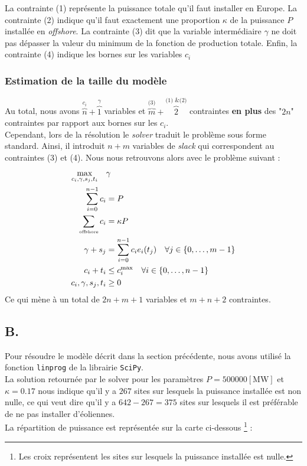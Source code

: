 \documentclass{article}
\begin{document}
La contrainte (1) représente la puissance totale qu'il faut installer en Europe. La contrainte (2) indique qu'il faut exactement une proportion $\kappa$ de la puissance $P$ installée en \textit{offshore}. La contrainte (3) dit que la variable intermédiaire $\gamma$ ne doit pas dépasser la valeur du minimum de la fonction de production totale. Enfin, la contrainte (4) indique les bornes sur les variables $c_i$

\subsubsection*{Estimation de la taille du modèle}
\noindent
Au total, nous avons $\overbrace{n}^{c_i} + \overbrace{1}^{\gamma}$
variables et $\overbrace{m}^{\text{(3)}} + \overbrace{2}^{\text{(1) \& (2)}}$ contraintes \textbf{en plus} des "$2n$" contraintes par rapport aux bornes sur les $c_i$.\\
Cependant, lors de la résolution le \textit{solver} traduit le problème sous forme standard. Ainsi, il introduit $n + m$ variables de \textit{slack} qui correspondent au contraintes (3) et (4). Nous nous retrouvons alors avec le problème suivant : 
\begin{align*}
    \max_{c_i, \gamma, s_j, t_i} \quad  
    &\gamma \nonumber \\ 
    \sum_{i=0}^{n-1} c_i &= P\\
    \sum_{\text{\tiny offshore}}c_i &= \kappa P\\
    \gamma + s_j &= \sum_{i=0}^{n-1} c_i e_i(t_j) \quad \forall j \in \{0, \ldots, m-1\}\\
    c_i + t_i &\le c_i^{\max} \quad \forall i \in \{0, \ldots, n-1\}\\
    c_i, \gamma, s_j, t_i &\ge 0
\end{align*}
Ce qui mène à un total de $2n + m + 1$ variables et $m + n + 2$ contraintes.

\subsection*{B.}
Pour résoudre le modèle décrit dans la section précédente, nous avons utilisé la fonction \verb|linprog| de la librairie \verb|SciPy|.\\
La solution retournée par le solver pour les paramètres $P = 500000 [\mathrm{MW}]$ et $\kappa = 0.17$ nous indique qu'il y a $267$ sites sur lesquels la puissance installée est non nulle, ce qui veut dire qu'il y a $642 - 267 = 375$ sites sur lesquels il est préférable de ne pas installer d'éoliennes.\\
La répartition de puissance est représentée sur la carte ci-dessous \footnote{Les croix représentent les sites sur lesquels la puissance installée est nulle.} :
\end{document}
